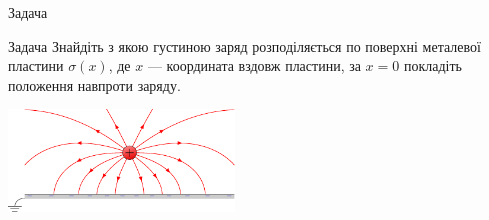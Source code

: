\documentclass{beamer}
\begin{document}
\begin{frame}{Задача}{}
       \begin{exampleblock}{Задача }
            Знайдіть з якою густиною заряд розподіляється по поверхні металевої пластини
            $\sigma(x)$, де $x$ --- координата вздовж пластини, за $x = 0$ покладіть положення
            навпроти заряду.
        \end{exampleblock}
		\begin{center}
			\includegraphics[width=6cm]{charge_near_plane.pdf}
		\end{center}
\end{frame}
\end{document}
